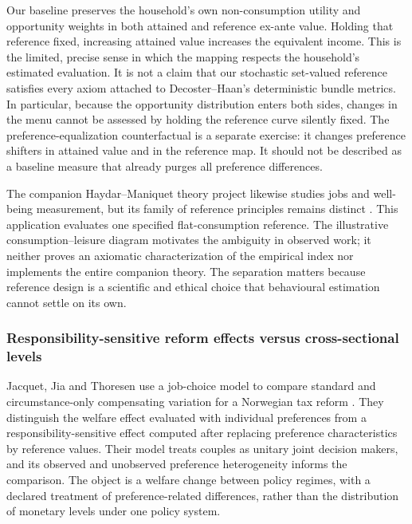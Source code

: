 \documentclass[11pt,a4paper]{article}
\begin{document}
Our baseline preserves the household's own non-consumption utility and opportunity weights in both attained and reference ex-ante value. Holding that reference fixed, increasing attained value increases the equivalent income. This is the limited, precise sense in which the mapping respects the household's estimated evaluation. It is not a claim that our stochastic set-valued reference satisfies every axiom attached to Decoster--Haan's deterministic bundle metrics. In particular, because the opportunity distribution enters both sides, changes in the menu cannot be assessed by holding the reference curve silently fixed. The preference-equalization counterfactual is a separate exercise: it changes preference shifters in attained value and in the reference map. It should not be described as a baseline measure that already purges all preference differences.

The companion Haydar--Maniquet theory project likewise studies jobs and well-being measurement, but its family of reference principles remains distinct \citep{haydarmaniquet}. This application evaluates one specified flat-consumption reference. The illustrative consumption--leisure diagram motivates the ambiguity in observed work; it neither proves an axiomatic characterization of the empirical index nor implements the entire companion theory. The separation matters because reference design is a scientific and ethical choice that behavioural estimation cannot settle on its own.

\subsubsection{Responsibility-sensitive reform effects versus cross-sectional levels}\label{responsibility-sensitive-reform-effects-versus-cross-sectional-levels}

Jacquet, Jia and Thoresen use a job-choice model to compare standard and circumstance-only compensating variation for a Norwegian tax reform \citep[sections 3--5]{jacquet2026}. They distinguish the welfare effect evaluated with individual preferences from a responsibility-sensitive effect computed after replacing preference characteristics by reference values. Their model treats couples as unitary joint decision makers, and its observed and unobserved preference heterogeneity informs the comparison. The object is a welfare change between policy regimes, with a declared treatment of preference-related differences, rather than the distribution of monetary levels under one policy system.
\end{document}

